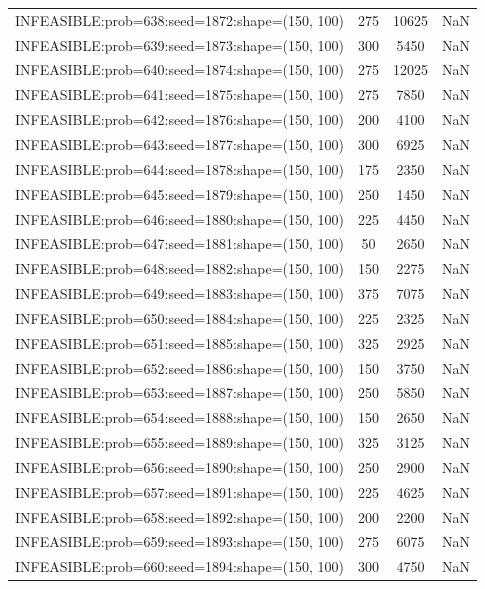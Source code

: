 \begin{longtable}{lccc}
INFEASIBLE:prob=638:seed=1872:shape=(150, 100) &      275 & 10625 &    NaN \\
INFEASIBLE:prob=639:seed=1873:shape=(150, 100) &      300 &  5450 &    NaN \\
INFEASIBLE:prob=640:seed=1874:shape=(150, 100) &      275 & 12025 &    NaN \\
INFEASIBLE:prob=641:seed=1875:shape=(150, 100) &      275 &  7850 &    NaN \\
INFEASIBLE:prob=642:seed=1876:shape=(150, 100) &      200 &  4100 &    NaN \\
INFEASIBLE:prob=643:seed=1877:shape=(150, 100) &      300 &  6925 &    NaN \\
INFEASIBLE:prob=644:seed=1878:shape=(150, 100) &      175 &  2350 &    NaN \\
INFEASIBLE:prob=645:seed=1879:shape=(150, 100) &      250 &  1450 &    NaN \\
INFEASIBLE:prob=646:seed=1880:shape=(150, 100) &      225 &  4450 &    NaN \\
INFEASIBLE:prob=647:seed=1881:shape=(150, 100) &       50 &  2650 &    NaN \\
INFEASIBLE:prob=648:seed=1882:shape=(150, 100) &      150 &  2275 &    NaN \\
INFEASIBLE:prob=649:seed=1883:shape=(150, 100) &      375 &  7075 &    NaN \\
INFEASIBLE:prob=650:seed=1884:shape=(150, 100) &      225 &  2325 &    NaN \\
INFEASIBLE:prob=651:seed=1885:shape=(150, 100) &      325 &  2925 &    NaN \\
INFEASIBLE:prob=652:seed=1886:shape=(150, 100) &      150 &  3750 &    NaN \\
INFEASIBLE:prob=653:seed=1887:shape=(150, 100) &      250 &  5850 &    NaN \\
INFEASIBLE:prob=654:seed=1888:shape=(150, 100) &      150 &  2650 &    NaN \\
INFEASIBLE:prob=655:seed=1889:shape=(150, 100) &      325 &  3125 &    NaN \\
INFEASIBLE:prob=656:seed=1890:shape=(150, 100) &      250 &  2900 &    NaN \\
INFEASIBLE:prob=657:seed=1891:shape=(150, 100) &      225 &  4625 &    NaN \\
INFEASIBLE:prob=658:seed=1892:shape=(150, 100) &      200 &  2200 &    NaN \\
INFEASIBLE:prob=659:seed=1893:shape=(150, 100) &      275 &  6075 &    NaN \\
INFEASIBLE:prob=660:seed=1894:shape=(150, 100) &      300 &  4750 &    NaN \\

\end{longtable}

